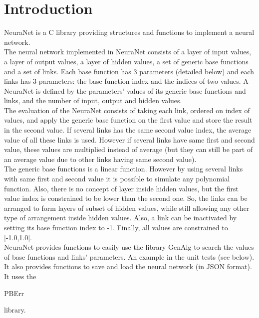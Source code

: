 \section*{Introduction}

NeuraNet is a C library providing structures and functions to implement a neural network.\\ 

The neural network implemented in NeuraNet consists of a layer of input values, a layer of output values, a layer of hidden values, a set of generic base functions and a set of links. Each base function has 3 parameters (detailed below) and each links has 3 parameters: the base function index and the indices of two values. A NeuraNet is defined by the parameters' values of its generic base functions and links, and the number of input, output and hidden values.\\

The evaluation of the NeuraNet consists of taking each link, ordered on index of values, and apply the generic base function on the first value and store the result in the second value. If several links has the same second value index, the average value of all these links is used. However if several links have same first and second value, these values are multiplied instead of average (but they can still be part of an average value due to other links having same second value).\\

The generic base functions is a linear function. However by using several links with same first and second value it is possible to simulate any polynomial function. Also, there is no concept of layer inside hidden values, but the first value index is constrained to be lower than the second one. So, the links can be arranged to form layers of subset of hidden values, while still allowing any other type of arrangement inside hidden values. Also, a link can be inactivated by setting its base function index to -1. Finally, all values are constrained to [-1.0,1.0].\\

NeuraNet provides functions to easily use the library GenAlg to search the values of base functions and links' parameters. An example in the unit tests (see below). It also provides functions to save and load the neural network (in JSON format).\\

It uses the \begin{ttfamily}PBErr\end{ttfamily} library.\\

